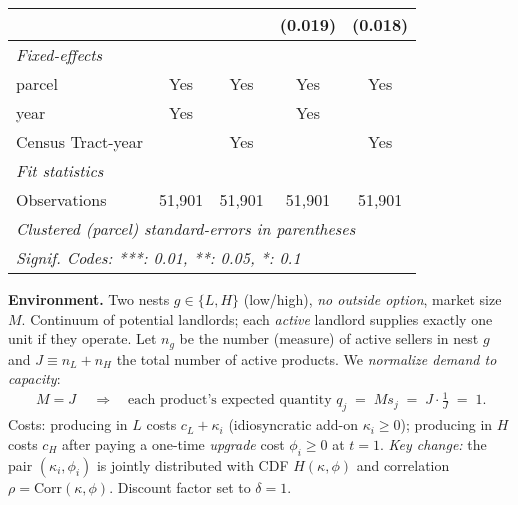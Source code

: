 \documentclass{article}
\begin{document}
\begin{table}[htbp]
{\begin{tabular}{lcccc}
                                 &               &                                     & (0.019)                   & (0.018)\\   
      \midrule
      \emph{Fixed-effects}\\
      parcel                     & Yes           & Yes                                 & Yes                       & Yes\\  
      year                       & Yes           &                                     & Yes                       & \\  
      Census Tract-year          &               & Yes                                 &                           & Yes\\  
      \midrule
      \emph{Fit statistics}\\
      Observations               & 51,901        & 51,901                              & 51,901                    & 51,901\\  
      \midrule \midrule
      \multicolumn{5}{l}{\emph{Clustered (parcel) standard-errors in parentheses}}\\
      \multicolumn{5}{l}{\emph{Signif. Codes: ***: 0.01, **: 0.05, *: 0.1}}\\
   \end{tabular}
   } %
\end{table}

\small

\textbf{Environment.}
Two nests $g\in\{L,H\}$ (low/high), \emph{no outside option}, market size $M$.
Continuum of potential landlords; each \emph{active} landlord supplies exactly one unit if they operate.
Let $n_g$ be the number (measure) of active sellers in nest $g$ and $J\equiv n_L+n_H$ the total number of active products.
We \emph{normalize demand to capacity}:
\begin{align*}
\boxed{\,M=J\,}
\quad\Rightarrow\quad 
\text{each product’s expected quantity } q_j \;=\; M s_j \;=\; J\cdot \tfrac{1}{J}\;=\;1.
\end{align*}
Costs: producing in $L$ costs $c_L+\kappa_i$ (idiosyncratic add-on $\kappa_i\ge 0$); producing in $H$ costs $c_H$ after paying a one-time \emph{upgrade} cost $\phi_i\ge 0$ at $t=1$.
\emph{Key change:} the pair $(\kappa_i,\phi_i)$ is jointly distributed with CDF $H(\kappa,\phi)$ and correlation $\rho=\mathrm{Corr}(\kappa,\phi)$.
Discount factor set to $\delta=1$.
\end{document}
